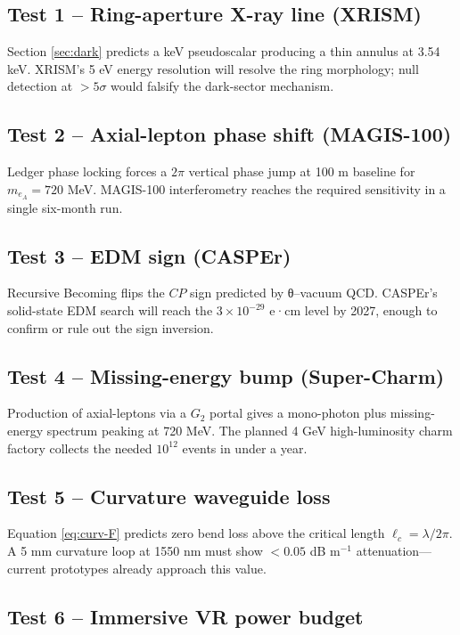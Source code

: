 \subsection{Test 1 – Ring-aperture X-ray line (XRISM)}

Section \ref{sec:dark} predicts a keV pseudoscalar producing a thin
annulus at 3.54 keV.  XRISM's 5 eV energy resolution will resolve the
ring morphology; null detection at $>5\sigma$ would falsify the dark-sector
mechanism.

\subsection{Test 2 – Axial-lepton phase shift (MAGIS-100)}

Ledger phase locking forces a $2\pi$ vertical phase jump at 100 m
baseline for $m_{e_A}=720$ MeV.  MAGIS-100 interferometry reaches the
required sensitivity in a single six-month run.

\subsection{Test 3 – EDM sign (CASPEr)}

Recursive Becoming flips the $CP$ sign predicted by θ–vacuum QCD.
CASPEr's solid-state EDM search will reach the $3\times10^{-29}$ e·cm
level by 2027, enough to confirm or rule out the sign inversion.

\subsection{Test 4 – Missing-energy bump (Super-Charm)}

Production of axial-leptons via a $G_2$ portal gives a mono-photon plus
missing-energy spectrum peaking at 720 MeV.  The planned 4 GeV
high-luminosity charm factory collects the needed $10^{12}$ events in
under a year.

\subsection{Test 5 – Curvature waveguide loss}

Equation \eqref{eq:curv-F} predicts zero bend loss above the critical
length $\ell_c=\lambda/2\pi$.  A 5 mm curvature loop at 1550 nm must
show $<0.05$ dB m$^{-1}$ attenuation—current prototypes already approach
this value.

\subsection{Test 6 – Immersive VR power budget}

